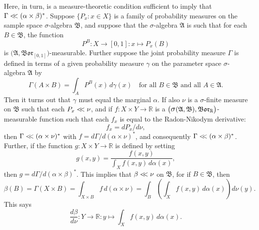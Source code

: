 \documentclass[
twoside=true,
paper=letter,
fontsize=9pt,
pagesize=auto,
leqno,
openany,
headsepline,
overfullrule,
]{scrbook}
\theoremstyle{plain}
\theoremstyle{plain}
\theoremstyle{definition}
\theoremstyle{bfnoteitalic}
\theoremstyle{bfnoteroman}
\newcommand{\sigalg}[1]{\mathfrak{#1}}
\newcommand{\borel}{\mathfrak{Bor}}
\newcommand{\sagb}{\mathop{\hbox{\large{$\sigma$}}}\nolimits}
\newcommand{\textsigma}{\hbox{\large{$\sigma$}}\kern-1pt}
\newcommand{\R}{\mathbb{R}}
\newcommand{\productsig}[2]{\sagb(#1,#2)}
\newcommand{\funcf}{f}
\newcommand{\funcg}{g}
\newcommand{\function}{f}
\newcommand{\functionii}{g}
\newcommand{\measurespace}{X}
\newcommand{\measurespaceii}{Y}
\newcommand{\abscont}{\mathrel{< \kern-3.5pt <}}
\newcommand{\measnu}{\nu}
\newcommand{\pspace}{\measurespace}%
\newcommand{\sspace}{\measurespaceii}%
\newcommand{\pspaceset}{A}
\newcommand{\sspaceset}{B}
\newcommand{\pspaceelt}{x}
\newcommand{\sspaceelt}{y}
\newcommand{\sspacesig}{\sigalg{B}}
\newcommand{\pspacesig}{\sigalg{A}}
\newcommand{\joint}{\Gamma}%
\newcommand{\measonprod}{\Gamma}%
\newcommand{\marginalone}{\alpha}%
\newcommand{\marginaltwo}{\beta}%
\newcommand{\prior}{\marginalone}
\newcommand{\predictive}{\marginaltwo}
\newcommand{\wouldbeprior}{\gamma}
\begin{document}
Here, in turn, is a measure-theoretic condition sufficient to imply that
$\measonprod\abscont (\prior\times\predictive)^*$.
Suppose
$\{ P_\pspaceelt :\pspaceelt\in\pspace \}$
is a family of probability measures on the sample space \textsigma-algebra
$\sspacesig$,
and suppose that the \textsigma\hyp{}algebra $\pspacesig$ is such that for each
$\sspaceset\in\sspacesig$, the function
\[
P^\sspaceset
:\pspace \to [0,1]
:\pspaceelt \mapsto P_\pspaceelt(\sspaceset)
\]
is $\bigl(\pspacesig,\borel_{[0,1]}\bigr)$\hyp{}measurable.
Further suppose the joint probability measure $\joint$  is defined in terms of
a given probability measure $\wouldbeprior$ on the parameter space \textsigma-algebra
$\pspacesig$ by
\[
\measonprod(\pspaceset\times\sspaceset)
=
\int_\pspaceset P^\sspaceset(\pspaceelt)
\, d\wouldbeprior(\pspaceelt)
\quad
\text{for all $\sspaceset\in\sspacesig$ and all $\pspaceset \in \pspacesig$.}
\]
Then it turns out that $\wouldbeprior$ must equal the marginal $\prior$.
If also $\measnu$ is a \textsigma-finite measure on $\sspacesig$
such that each
$P_\pspaceelt\abscont \measnu$, and if
$\funcf : \pspace\times\sspace\to\R$ is a
$\bigl(\productsig{\pspacesig}{\sspacesig},\borel_\R\bigr)$\hyp{}measurable function
such that each $\funcf_\pspaceelt$ is equal to the Radon-Nikodym derivative:
\begin{equation}\label{as_density}
\function_\pspaceelt
=
d P_\pspaceelt/d\measnu,
\end{equation}
then
$\joint \abscont (\prior \times\measnu)^*$
with
$\function
=
d\measonprod/d(\prior \times\measnu)^*$,
and consequently
$\measonprod\abscont (\prior\times\predictive)^*$.
Further, if the function
$\funcg: \pspace\times\sspace\to\R$ is defined by setting
\[\functionii(\pspaceelt,\sspaceelt)
=
\frac
{\function(\pspaceelt,\sspaceelt)}
{\int_\pspace \function(\pspaceelt,\sspaceelt)\,
d\prior(\pspaceelt)},
\]
then
$\functionii
=
d\measonprod/d(\prior\times\predictive)^*$.
This implies that $\predictive \abscont \measnu$ on $\sspacesig$, for if $\sspaceset\in\sspacesig$, then
\[
\predictive(\sspaceset)
= \measonprod(\pspace \times \sspaceset) 
= \int_{\pspace \times \sspaceset} \function \, d(\prior\times\measnu)
= \int_\sspaceset\left( \int_\pspace \function(\pspaceelt, \sspaceelt)\,d\prior(x)\right) d\measnu(\sspaceelt).
\]
This says 
\[
\frac{d\predictive}{d\measnu}:
\sspace\to\R:
\sspaceelt\mapsto \int_\pspace \function(\pspaceelt,\sspaceelt)\,d\prior(x).
\]
\end{document}

